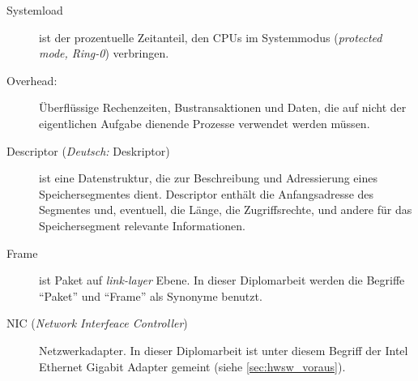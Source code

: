 {\begin{description}
\item[Systemload] ist der prozentuelle Zeitanteil, den CPUs im
	Systemmodus (\emph{protected mode, Ring-0}) verbringen. 

\item [Overhead:] Überflüssige Rechenzeiten, Bustransaktionen  und Daten, die
	auf nicht der eigentlichen Aufgabe dienende Prozesse verwendet werden
	müssen.

\item [Descriptor (\emph{Deutsch:} Deskriptor)] ist eine Datenstruktur, die
	zur Beschreibung und Adressierung eines Speichersegmentes dient.
	Descriptor enthält die Anfangsadresse des Segmentes und, eventuell, die
	Länge, die Zugriffsrechte, und andere für das Speichersegment relevante
	Informationen.
\item [Frame] ist Paket auf \emph{link-layer} Ebene. In dieser Diplomarbeit werden
	die Begriffe ``Paket'' und ``Frame'' als Synonyme benutzt. 

\item [NIC (\emph{Network Interfeace Controller})] Netzwerkadapter. In dieser
	Diplomarbeit ist unter diesem Begriff  der Intel Ethernet Gigabit Adapter
	gemeint (siehe \ref{sec:hwsw_voraus}).

\end{description}


}
